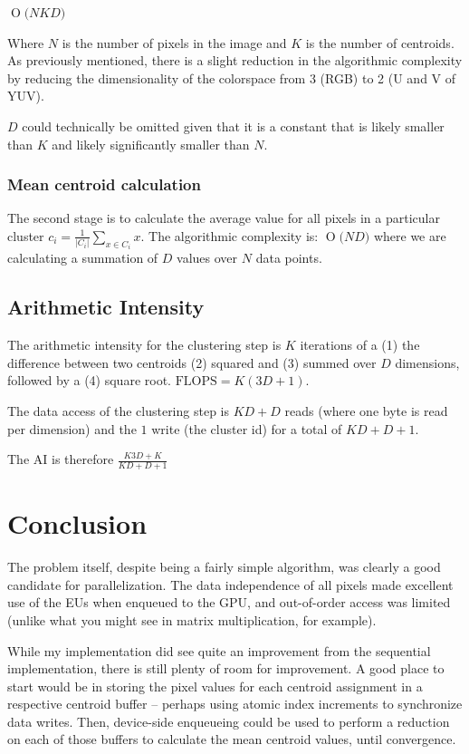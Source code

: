 \documentclass[11pt]{article}
\newcommand{\BigO}[1]{\ensuremath{\operatorname{O}\bigl(#1\bigr)}}
\begin{document}
$\BigO{NKD}$

Where $N$ is the number of pixels in the image and $K$ is the number of centroids. As
previously mentioned, there is a slight reduction in the algorithmic complexity by
reducing the dimensionality of the colorspace from 3 (RGB) to 2 (U and V of YUV).

$D$ could technically be omitted given that it is a constant that is likely smaller
than $K$ and likely significantly smaller than $N$.

\subsubsection{Mean centroid calculation}

The second stage is to calculate the average value for all pixels in a particular
cluster $c_i = \frac{1}{|C_i|}\sum_{x \in C_i}x$. The algorithmic complexity is: $\BigO{ND}$
where we are calculating a summation of $D$ values over $N$ data points.

\subsection{Arithmetic Intensity}

The arithmetic intensity for the clustering step is $K$ iterations of a (1) the difference
between two centroids (2) squared and (3) summed over $D$ dimensions, followed by a (4)
square root. $\text{FLOPS} = K(3D+1)$.

The data access of the clustering step is $KD+D$ reads (where one byte is read per dimension)
and the $1$ write (the cluster id) for a total of $KD+D+1$.

The AI is therefore $\frac{K3D+K}{KD+D+1}$

\section{Conclusion}

The problem itself, despite being a fairly simple algorithm, was clearly a good candidate for
parallelization. The data independence of all pixels made excellent use of the EUs when enqueued
to the GPU, and out-of-order access was limited (unlike what you might see in matrix multiplication,
for example).

While my implementation did see quite an improvement from the sequential implementation, there is still
plenty of room for improvement. A good place to start would be in storing the pixel values for each
centroid assignment in a respective centroid buffer -- perhaps using atomic index increments to synchronize
data writes. Then, device-side enqueueing could be used to perform a reduction on each of those buffers
to calculate the mean centroid values, until convergence.
\end{document}
